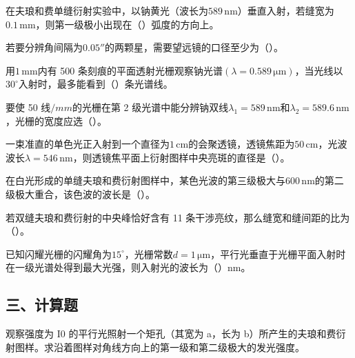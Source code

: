 \documentclass[standard, analysis, notocnum]{ExBook}
\newcommand{\answerarea}[1][8cm]{%
  \par\vspace{2mm}%
  \noindent{\color{themeColor!35}\rule{\linewidth}{0.4pt}}\par
  \noindent\begin{minipage}[t][#1][t]{\linewidth}\vspace{0pt}\end{minipage}\par
  \noindent{\color{themeColor!35}\rule{\linewidth}{0.4pt}}\par
}
\begin{document}
\begin{qitems}
\begin{bbox}
\qitem 在夫琅和费单缝衍射实验中，以钠黄光（波长为$589\,\mathrm{nm}$）垂直入射，若缝宽为$0.1\,\mathrm{mm}$，则第一级极小出现在（\hspace{1.6em}）弧度的方向上。
\answerarea[3.5cm]
\end{bbox}
\begin{bbox}
\qitem 若要分辨角间隔为$0.05''$的两颗星，需要望远镜的口径至少为（\hspace{1.6em}）。
\answerarea[3.5cm]
\end{bbox}
\begin{bbox}
\qitem 用$1\,\mathrm{mm}$内有 500 条刻痕的平面透射光栅观察钠光谱$(\lambda =0.589\,\mathrm{\mu m})$，当光线以$30^{\circ}$入射时，最多能看到（\hspace{1.6em}）条光谱线。
\answerarea[3.5cm]
\end{bbox}
\begin{bbox}
\qitem 要使 50 线$/mm$的光栅在第 2 级光谱中能分辨钠双线$\lambda_{1}=589\,\mathrm{nm}$和$\lambda_{2}=589.6\,\mathrm{nm}$，光栅的宽度应选（\hspace{1.6em}）。
\answerarea[3.5cm]
\end{bbox}
\begin{bbox}
\qitem 一束准直的单色光正入射到一个直径为$1\,\mathrm{cm}$的会聚透镜，透镜焦距为$50\,\mathrm{cm}$，光波波长$\lambda =546\,\mathrm{nm}$，则透镜焦平面上衍射图样中央亮斑的直径是（\hspace{1.6em}）。
\answerarea[3.5cm]
\end{bbox}
\begin{bbox}
\qitem 在白光形成的单缝夫琅和费衍射图样中，某色光波的第三级极大与$600\,\mathrm{nm}$的第二级极大重合，该色波的波长是（\hspace{1.6em}）。
\answerarea[3.5cm]
\end{bbox}
\begin{bbox}
\qitem 若双缝夫琅和费衍射的中央峰恰好含有 11 条干涉亮纹，那么缝宽和缝间距的比为（\hspace{1.6em}）。
\answerarea[3.5cm]
\end{bbox}
\begin{bbox}
\qitem 已知闪耀光栅的闪耀角为$15^{\circ}$，光栅常数$d=1\,\mathrm{\mu m}$，平行光垂直于光栅平面入射时在一级光谱处得到最大光强，则入射光的波长为（\hspace{1.6em}）nm。
\answerarea[3.5cm]
\end{bbox}
\end{qitems}

\subsection{三、计算题}
\begin{qitems}[startnum=1]
\qitem 观察强度为 I0 的平行光照射一个矩孔（其宽为 a，长为 b）所产生的夫琅和费衍射图样。求沿着图样对角线方向上的第一级和第二级极大的发光强度。
\label{q:240:start}
\answerarea[8cm]
\label{q:240:end}
\end{qitems}
\end{document}
